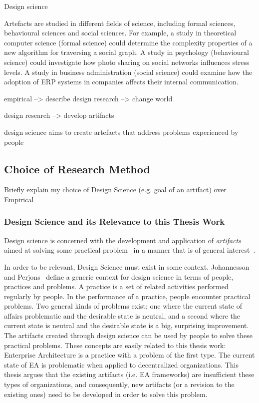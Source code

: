 Design science

Artefacts are studied in different fields of science, including formal
sciences, behavioural sciences and social sciences. For example, a
study in theoretical computer science (formal science) could determine
the complexity properties of a new algorithm for traversing a
social graph. A study in psychology (behavioural science) could investigate
how photo sharing on social networks influences stress
levels. A study in business administration (social science) could examine
how the adoption of ERP systems in companies affects their
internal communication.



empirical --> describe
design research --> change world

design research --> develop artifacts

design science aims to create artefacts that address
problems experienced by people



\subsection{Choice of Research Method}

Briefly explain my choice of Design Science (e.g. goal of an artifact) over Empirical 

\subsubsection{Design Science and its Relevance to this Thesis Work}


Design science is concerned with the development and application of \textit{artifacts} aimed at solving some practical problem~\cite{hevner2004,johannessonPerjons2012} in a manner that is of general interest~\cite{johannessonPerjons2012}. 

In order to be relevant, Design Science must exist in some context. Johannesson and Perjons~\cite{johannessonPerjons2012} define a generic context for design science in terms of people, practices and problems. A practice is a set of related activities performed regularly by people. In the performance of a practice, people encounter practical problems. Two general kinds of problems exist; one where the current state of affairs problematic and the desirable state is neutral, and a second where the current state is neutral and the desirable state is a big, surprising improvement. The artifacts created through design science can be used by people to solve these practical problems. These concepts are easily related to this thesis work: Enterprise Architecture is a practice with a problem of the first type.  The current state of EA is problematic when applied to decentralized organizations. This thesis argues that the existing artifacts (i.e. EA frameworks) are insufficient these types of organizations, and consequently, new artifacts (or a revision to the existing ones) need to be developed in order to solve this problem.

